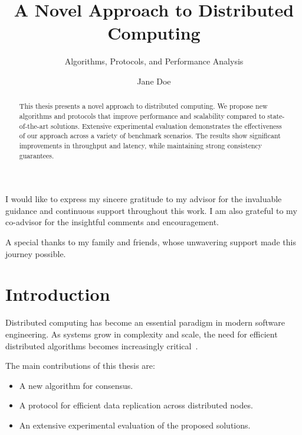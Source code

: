 \documentclass[master,english,lof,lot]{tvthesis}
\title{A Novel Approach to Distributed Computing}
\subtitle{Algorithms, Protocols, and Performance Analysis}
\author{Jane Doe}
\begin{document}
\maketitle

\frontmatter

\dedication{To my family}

\tableofcontents

\begin{abstract}
This thesis presents a novel approach to distributed computing.
We propose new algorithms and protocols that improve performance
and scalability compared to state-of-the-art solutions. Extensive experimental
evaluation demonstrates the effectiveness of our approach across a variety of
benchmark scenarios. The results show significant improvements in throughput and
latency, while maintaining strong consistency guarantees.
\end{abstract}

\begin{acknowledgments}
I would like to express my sincere gratitude to my advisor for the invaluable
guidance and continuous support throughout this work. I am also grateful to my
co-advisor for the insightful comments and encouragement.

A special thanks to my family and friends, whose unwavering support made this
journey possible.
\end{acknowledgments}



\mainmatter

\chapter{Introduction}
\label{ch:introduction}

Distributed computing has become an essential paradigm in modern software
engineering. As systems grow in complexity and scale, the need for efficient
distributed algorithms becomes increasingly critical~\cite{tanenbaum2007}.

The main contributions of this thesis are:
\begin{itemize}
    \item A new algorithm for consensus.
    \item A protocol for efficient data replication across distributed nodes.
    \item An extensive experimental evaluation of the proposed solutions.
\end{itemize}
\end{document}
